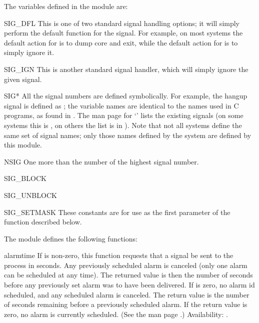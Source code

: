 The variables defined in the  module are:

\begin{datadesc}{SIG_DFL}
  This is one of two standard signal handling options; it will simply
  perform the default function for the signal.  For example, on most
  systems the default action for  is to dump core
  and exit, while the default action for  is to
  simply ignore it.
\end{datadesc}

\begin{datadesc}{SIG_IGN}
  This is another standard signal handler, which will simply ignore
  the given signal.
\end{datadesc}

\begin{datadesc}{SIG*}
  All the signal numbers are defined symbolically.  For example, the
  hangup signal is defined as ; the variable names
  are identical to the names used in C programs, as found in
  .
  The \UNIX{} man page for `' lists the existing
  signals (on some systems this is , on others the
  list is in ).
  Note that not all systems define the same set of signal names; only
  those names defined by the system are defined by this module.
\end{datadesc}

\begin{datadesc}{NSIG}
  One more than the number of the highest signal number.
\end{datadesc}

\begin{datadesc}{SIG_BLOCK}
\end{datadesc}
\begin{datadesc}{SIG_UNBLOCK}
\end{datadesc}
\begin{datadesc}{SIG_SETMASK}
  These constants are for use as the first parameter of the
   function described below.
\end{datadesc}


The  module defines the following functions:

\begin{funcdesc}{alarm}{time}
  If  is non-zero, this function requests that a
   signal be sent to the process in  seconds.
  Any previously scheduled alarm is canceled (only one alarm can
  be scheduled at any time).  The returned value is then the number of
  seconds before any previously set alarm was to have been delivered.
  If  is zero, no alarm id scheduled, and any scheduled
  alarm is canceled.  The return value is the number of seconds
  remaining before a previously scheduled alarm.  If the return value
  is zero, no alarm is currently scheduled.  (See the \UNIX{} man page
  .)
  Availability: \UNIX.
\end{funcdesc}

